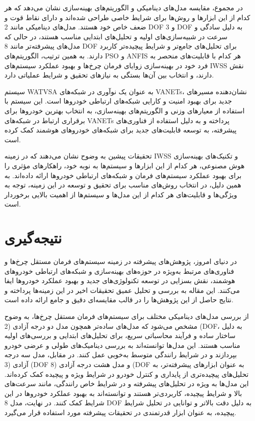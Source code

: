 \documentclass[a4paper,10pt]{article}
\begin{document}
        در مجموع، مقایسه مدل‌های دینامیکی و الگوریتم‌های بهینه‌سازی نشان می‌دهد که هر کدام از این ابزارها و روش‌ها برای شرایط خاصی طراحی شده‌اند و دارای نقاط قوت و ضعف خاص خود هستند. مدل‌های دینامیکی مانند 2 DOF و 3 DOF به دلیل سادگی و سرعت در شبیه‌سازی‌های اولیه و تحلیل‌های ابتدایی مناسب هستند، در حالی که مدل‌های پیشرفته‌تر مانند 8 DOF برای تحلیل‌های جامع‌تر و شرایط پیچیده‌تر کاربرد دارند. به همین ترتیب، الگوریتم‌های PSO و ANFIS هر کدام با قابلیت‌های منحصر به فرد خود در بهینه‌سازی زوایای فرمان چرخ‌ها و بهبود عملکرد سیستم‌های IWSS نقش دارند، و انتخاب بین آن‌ها بستگی به نیازهای تحقیق و شرایط عملیاتی دارد.

        سیستم WATVSA به عنوان یک نوآوری در شبکه‌های VANETs، نشان‌دهنده مسیرهای جدید برای بهبود امنیت و کارایی شبکه‌های ارتباطی خودروها است. این سیستم با استفاده از معیارهای وزنی و الگوریتم‌های بهینه‌سازی، به انتخاب بهترین خودروها برای برقراری ارتباط در شبکه‌های VANETs پرداخته و به دلیل استفاده از فناوری‌های پیشرفته، به توسعه قابلیت‌های جدید برای شبکه‌های خودروهای هوشمند کمک کرده است.

        تحقیقات پیشین به وضوح نشان می‌دهند که در زمینه IWSS و تکنیک‌های بهینه‌سازی هوش مصنوعی، هر کدام از این ابزارها و سیستم‌ها به نوبه خود، راهکارهای مؤثری را برای بهبود عملکرد سیستم‌های فرمان و شبکه‌های ارتباطی خودروها ارائه داده‌اند. به همین دلیل، در انتخاب روش‌های مناسب برای تحقیق و توسعه در این زمینه، توجه به ویژگی‌ها و قابلیت‌های هر کدام از این مدل‌ها و سیستم‌ها از اهمیت بالایی برخوردار است.

    \section{نتیجه‌گیری}

        در دنیای امروز، پژوهش‌های پیشرفته در زمینه سیستم‌های فرمان مستقل چرخ‌ها و فناوری‌های مرتبط به‌ویژه در حوزه‌های بهینه‌سازی و شبکه‌های ارتباطی خودروهای هوشمند، نقش بسزایی در توسعه تکنولوژی‌های جدید و بهبود عملکرد خودروها ایفا می‌کنند. این مقاله به بررسی و تحلیل عمیق تحقیقات اخیر در این زمینه‌ها پرداخته و نتایج حاصل از این پژوهش‌ها را در قالب مقایسه‌ای دقیق و جامع ارائه داده است.

        از بررسی مدل‌های دینامیکی مختلف برای سیستم‌های فرمان مستقل چرخ‌ها، به وضوح مشخص می‌شود که مدل‌های ساده‌تر همچون مدل دو درجه آزادی (2 (DOF، به دلیل ساختار ساده و فرآیند محاسباتی سریع، برای تحلیل‌های ابتدایی و بررسی‌های اولیه مناسب هستند. این مدل‌ها توانسته‌اند به بررسی دینامیک‌های طولی و عرضی خودرو بپردازند و در شرایط رانندگی متوسط به‌خوبی عمل کنند. در مقابل، مدل سه درجه آزادی (3 (DOF و مدل هشت درجه آزادی (8 (DOF به عنوان ابزارهای پیشرفته‌تر، به تحلیل‌های پیچیده‌تری از پایداری و کنترل خودرو در شرایط ویژه و پیچیده کمک کرده‌اند. این مدل‌ها به ویژه در تحلیل‌های پیشرفته و در شرایط خاص رانندگی، مانند سرعت‌های بالا و شرایط پیچیده، کاربردی‌تر هستند و توانسته‌اند به بهبود عملکرد خودروها در این شرایط کمک کنند. در نهایت، مدل 8 DOF به دلیل دقت بالاتر و توانایی در تحلیل شرایط پیچیده، به عنوان ابزار قدرتمندی در تحقیقات پیشرفته مورد استفاده قرار می‌گیرد.
\end{document}
